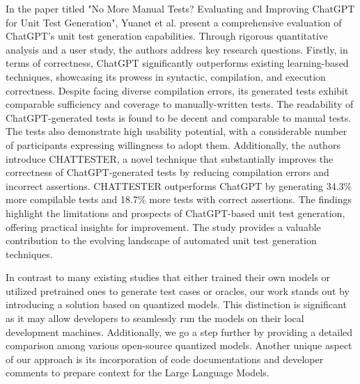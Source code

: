 In the paper titled "No More Manual Tests? Evaluating and Improving ChatGPT for Unit Test Generation"\cite{yuan_no_2023}, Yuanet et al. present a comprehensive evaluation of ChatGPT's unit test generation capabilities. Through rigorous quantitative analysis and a user study, the authors address key research questions. Firstly, in terms of correctness, ChatGPT significantly outperforms existing learning-based techniques, showcasing its prowess in syntactic, compilation, and execution correctness. Despite facing diverse compilation errors, its generated tests exhibit comparable sufficiency and coverage to manually-written tests. The readability of ChatGPT-generated tests is found to be decent and comparable to manual tests. The tests also demonstrate high usability potential, with a considerable number of participants expressing willingness to adopt them. Additionally, the authors introduce CHATTESTER\cite{yuan_no_2023}, a novel technique that substantially improves the correctness of ChatGPT-generated tests by reducing compilation errors and incorrect assertions. CHATTESTER outperforms ChatGPT by generating 34.3\% more compilable tests and 18.7\% more tests with correct assertions. The findings highlight the limitations and prospects of ChatGPT-based unit test generation, offering practical insights for improvement. The study provides a valuable contribution to the evolving landscape of automated unit test generation techniques.

In contrast to many existing studies that either trained\cite{} their own models or utilized pretrained\cite{} ones to generate test cases or oracles, our work stands out by introducing a solution based on quantized models\cite{}. This distinction is significant as it may allow developers to seamlessly run the models on their local development machines. Additionally, we go a step further by providing a detailed comparison among various open-source quantized models. Another unique aspect of our approach is its incorporation of code documentations and developer comments to prepare context for the Large Language Models.